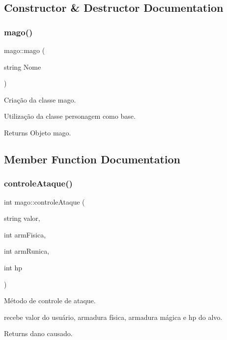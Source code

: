 \subsection{Constructor \& Destructor Documentation}
\mbox{\label{classmago_ae5292ae10f4e5cae0a4a73d185807fbc}} 
\subsubsection{\texorpdfstring{mago()}{mago()}}
{\footnotesize\ttfamily mago\+::mago (\begin{DoxyParamCaption}\item[{string}]{Nome }\end{DoxyParamCaption})}



Criação da classe mago. 

Utilização da classe personagem como base. \begin{DoxyReturn}{Returns}
Objeto mago. 
\end{DoxyReturn}


\subsection{Member Function Documentation}
\mbox{\label{classmago_af10f6c9bcbbf77870f376a48b1cd0601}} 
\subsubsection{\texorpdfstring{controle\+Ataque()}{controleAtaque()}}
{\footnotesize\ttfamily int mago\+::controle\+Ataque (\begin{DoxyParamCaption}\item[{string}]{valor,  }\item[{int}]{arm\+Fisica,  }\item[{int}]{arm\+Runica,  }\item[{int}]{hp }\end{DoxyParamCaption})}



Método de controle de ataque. 

recebe valor do usuário, armadura física, armadura mágica e hp do alvo. \begin{DoxyReturn}{Returns}
dano causado. 
\end{DoxyReturn}
\mbox{\label{classmago_ac0a8309b459ab7f27f356eff72817c2f}} 
